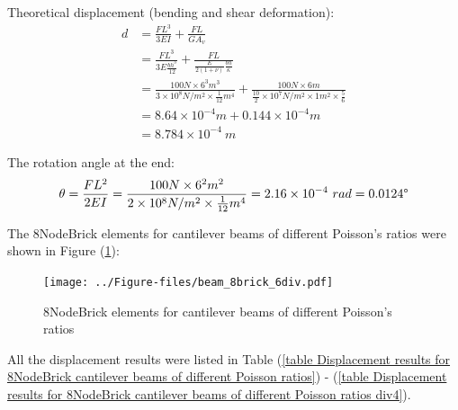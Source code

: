 \documentclass[fleqn,11pt]{article}
\begin{document}
Theoretical displacement (bending and shear deformation):
\begin{equation}
  \begin{aligned}
  d &=\frac{FL^3}{3EI}+\frac{FL}{GA_v} \\
  &= \frac{FL^3}{3E\frac{bh^3}{12}}+\frac{FL}{\frac{E}{2(1+\nu)} \frac{bh}{\kappa}} \\ 
    &= \frac{100 N \times 6^3 m^3}{3\times 10^8 N/m^2 \times \frac{1}{12} m^4}+ 
    \frac{100 N\times 6 m}{\frac{10}{2} \times 10^7 N/m^2\times 1 m^2 \times \frac{5}{6}} \\ 
    &=8.64\times 10^{-4} m + 0.144 \times 10^{-4} m   \\
   & =8.784\times 10^{-4} \ m
   \end{aligned}
\end{equation}

The rotation angle at the end:
\begin{equation}
  \theta =\frac{FL^2}{2EI} 
   =\frac{100 N \times 6^2 m^2} {2\times 10^8 N/m^2 \times \frac{1}{12} m^4} 
 =2.16 \times 10^{-4} \ rad = 0.0124 \degree 
\end{equation}

The 8NodeBrick elements for cantilever beams of different Poisson's ratios were shown in Figure (\ref{fig 8NodeBrick elements for cantilever beams of different Poisson's ratios}):
\begin{figure}[H]
  \centering
  \texttt{[image: ../Figure-files/beam\_8brick\_6div.pdf]}
  \caption{8NodeBrick elements for cantilever beams of different Poisson's ratios}
  \label{fig 8NodeBrick elements for cantilever beams of different Poisson's ratios}
\end{figure}


All the displacement results were listed in Table (\ref{table Displacement results for 8NodeBrick cantilever beams of different Poisson ratios}) - (\ref{table Displacement results for 8NodeBrick cantilever beams of different Poisson ratios div4}). 
\end{document}
